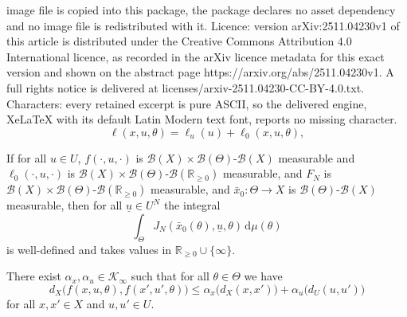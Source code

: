 \documentclass[10pt,a4paper]{amsart}
\newcommand{\Borel}{\mathcal{B}} %
\newcommand{\Rnn}{\mathbb{R}_{\geq 0}} %
\newcommand{\cKi}{\mathcal{K}_\infty} %
\newcommand{\diff}{\, \mathrm{d}} %
\newcommand{\es}{\bar{x}} %
\newcommand{\is}[1]{{\underline{#1}}} %
\begin{document}
image file is copied into this package, the package declares no asset dependency and no image file is redistributed with it. Licence: version arXiv:2511.04230v1 of this article is distributed under the Creative Commons Attribution 4.0 International licence, as recorded in the arXiv licence metadata for this exact version and shown on the abstract page https://arxiv.org/abs/2511.04230v1. A full rights notice is delivered at licenses/arxiv-2511.04230-CC-BY-4.0.txt. Characters: every retained excerpt is pure ASCII, so the delivered engine, XeLaTeX with its default Latin Modern text font, reports no missing character.
\begin{equation} \label{eq:dteoc:ecc:formOfEll}
    \ell(x,u,\theta)=\ell_u(u) + \ell_0(x,u,\theta),
\end{equation}

\begin{lemma} \label{lem:dteoc:ecc:functionalWelldefined}
If for all $u\in U$, $f(\cdot,u,\cdot)$ is $\Borel(X)\times\Borel(\Theta)$-$\Borel(X)$ measurable
and $\ell_0(\cdot,u,\cdot)$ is $\Borel(X)\times\Borel(\Theta)$-$\Borel(\Rnn)$ measurable,
and $F_N$ is $\Borel(X)\times\Borel(\Theta)$-$\Borel(\Rnn)$ measurable,
and $\es_0 \colon \Theta \rightarrow X$ is $\Borel(\Theta)$-$\Borel(X)$ measurable,
then for all $\is{u}\in U^N$ the integral
\begin{equation}
    \int_{\Theta} J_N(\es_0(\theta),\is{u},\theta) \diff \mu(\theta)
\end{equation}
is well-defined and takes values in $\Rnn\cup\{\infty\}$.
\end{lemma}

\begin{assumption} \label{assump:dteoc:continuityOfTransitionFunction}
There exist $\alpha_x,\alpha_u\in\cKi$ such that for all $\theta\in\Theta$ we have
\begin{equation*}
    d_X \big( f(x,u,\theta), f(x',u',\theta) \big) \leq \alpha_x\big( d_X(x,x') \big) + \alpha_u \big( d_U(u,u') \big)
\end{equation*}
for all $x,x'\in X$ and $u,u' \in U$. 
\end{assumption}
\end{document}
